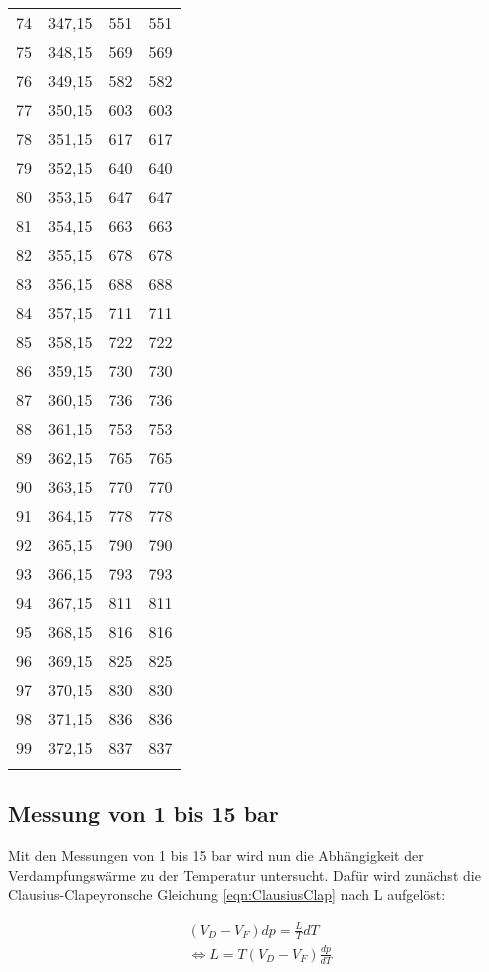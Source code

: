 \begin{longtable}{c  c  c  c}
      74  & 347,15 & 551 & 551  \\
      75  & 348,15 & 569 & 569  \\
      76  & 349,15 & 582 & 582  \\
      77  & 350,15 & 603 & 603  \\
      78  & 351,15 & 617 & 617  \\
      79  & 352,15 & 640 & 640  \\
      80  & 353,15 & 647 & 647  \\
      81  & 354,15 & 663 & 663  \\
      82  & 355,15 & 678 & 678  \\
      83  & 356,15 & 688 & 688  \\
      84  & 357,15 & 711 & 711  \\
      85  & 358,15 & 722 & 722  \\
      86  & 359,15 & 730 & 730  \\
      87  & 360,15 & 736 & 736  \\
      88  & 361,15 & 753 & 753  \\
      89  & 362,15 & 765 & 765  \\
      90  & 363,15 & 770 & 770  \\
      91  & 364,15 & 778 & 778  \\
      92  & 365,15 & 790 & 790  \\
      93  & 366,15 & 793 & 793  \\
      94  & 367,15 & 811 & 811  \\
      95  & 368,15 & 816 & 816  \\
      96  & 369,15 & 825 & 825  \\
      97  & 370,15 & 830 & 830  \\
      98  & 371,15 & 836 & 836  \\
      99  & 372,15 & 837 & 837  \\ \\
  \end{longtable} 

\subsection{Messung von 1 bis 15 bar}

Mit den Messungen von 1 bis 15 bar wird nun die Abhängigkeit der Verdampfungswärme
zu der Temperatur untersucht. Dafür wird zunächst die Clausius-Clapeyronsche Gleichung \ref{eqn:ClausiusClap}
nach L aufgelöst:

\begin{align}
  (V_D - V_F)dp = \frac{L}{T}dT \\
  \Leftrightarrow L = T(V_D - V_F)\frac{dp}{dT}
\end{align}

